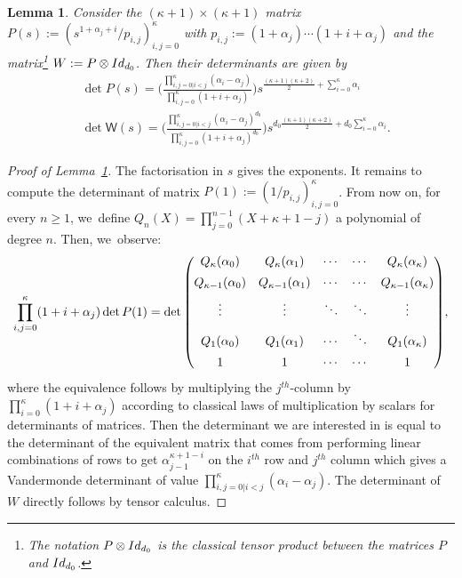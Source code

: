 \documentclass[10pt]{amsart}
\newtheorem{lemma}[theorem]{Lemma}
\theoremstyle{definition}
\newcommand{\sW}{{\mathsf W}}
\newcommand{\I}{\textup{Id}}\let\Id\I
\begin{document}
\begin{lemma}
\label{lem:wronskian}
Consider the $(\kappa+1)\times(\kappa+1)$ matrix
$P(s):= (s^{1+\alpha_j+i}/p_{i,j})_{i,j=0} ^\kappa$ with
$p_{i,j}:=(1+\alpha_j) \cdots (1+i+\alpha_j)$ and the matrix\footnote{The notation $P\otimes \I_{d_0}$ is the classical tensor product between the matrices $P$
and $\I_{d_0}$.} $W:=P\otimes \I_{d_0}$. Then their
determinants are given by
\begin{equation}
\label{eq:det-k}
\begin{aligned}
&\det P(s)=
\biggl(\frac{ \prod_{i, j=0 | i<j}^\kappa
(\alpha_i - \alpha_j)}{\prod_{i,j=0} ^\kappa(1+i+\alpha_j)}
\biggr) s^{ \frac{(\kappa+1)(\kappa+2)}{2}+\sum_{i=0}^\kappa \alpha_i}\\
&\det \sW(s) = \biggl(\frac{ \prod_{i, j=0 | i<j}^\kappa
(\alpha_i - \alpha_j)^{d_0}}{\prod_{i,j=0} ^\kappa(1+i+\alpha_j)^{d_0}}
\biggr) s^{d_0 \frac{(\kappa+1)(\kappa+2)}{2}+d_0\sum_{i=0}^\kappa \alpha_i}.
\end{aligned}
\end{equation}
\end{lemma}
\begin{proof}[Proof of Lemma~\ref{lem:wronskian}]
The factorisation in $s$ gives the exponents. It remains to compute the determinant of matrix ${P}(1):= (1/p_{i,j})_{i,j=0} ^\kappa$. From now on,
for every $n\geq1$, we~define $Q_n(X)=\prod_{j=0}^{n-1} (X+\kappa+1-j)$ a polynomial of degree $n$. Then, we~observe:
\[\arraycolsep5pt
\prod_{i,j=0} ^\kappa (1+i+\alpha_j) \det {P}(1)=
\det
\begin{pmatrix}
Q_{\kappa}(\alpha_0) & Q_{\kappa}(\alpha_1) &\cdots& \cdots & Q_{\kappa}(\alpha_{\kappa}) \\[5pt]
Q_{\kappa-1}(\alpha_0) & Q_{\kappa-1}(\alpha_1) &\cdots& \cdots & Q_{\kappa-1}(\alpha_{\kappa}) \\[5pt]
\vdots & \vdots& \ddots & \ddots & \vdots \\[5pt]
Q_{1}(\alpha_0) & Q_{1}(\alpha_1) &\cdots& \ddots & Q_{1}(\alpha_{\kappa}) \\[5pt]
1 & 1 &\cdots& \cdots & 1
\end{pmatrix}\!,
\]
where the equivalence follows by multiplying the $j^{th}$-column by $\prod_{i=0}^\kappa (1+i+\alpha_j)$ according to classical laws of multiplication by scalars for determinants of matrices. Then the determinant we are interested in is equal to the determinant of the equivalent matrix that comes from performing linear combinations of rows to get $\alpha_{j-1}^{\kappa+1-i}$ on the $i^{th}$ row and $j^{th}$ column which gives a Vandermonde determinant of value $\prod_{i, j=0 | i<j}^\kappa (\alpha_i - \alpha_j)$. The determinant of $W$ directly follows by tensor calculus.
\end{proof}
\end{document}
